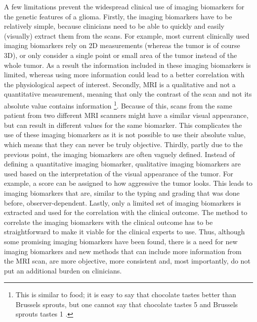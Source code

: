 A few limitations prevent the widespread clinical use of imaging biomarkers for the genetic features of a \gls{glioma}.
Firstly, the imaging biomarkers have to be relatively simple, because clinicians need to be able to quickly and easily (visually) extract them from the scans.
For example, most current clinically used imaging biomarkers rely on 2D measurements (whereas the \gls{tumor} is of course 3D), or only consider a single point or small area of the \gls{tumor} instead of the whole \gls{tumor}.
As a result the information included in these imaging biomarkers is limited, whereas using more information could lead to a better correlation with the physiological aspect of interest.
Secondly, \gls{MRI} is a qualitative and not a quantitative measurement, meaning that only the contrast of the scan and not its absolute value contains information \footnote{This is similar to food; it is easy to say that chocolate tastes better than Brussels sprouts, but one cannot say that chocolate tastes 5  and Brussels sprouts tastes 1 .}.
Because of this, scans from the same patient from two different \gls{MRI} scanners might have a similar visual appearance, but can result in different values for the same biomarker.
This complicates the use of these imaging biomarkers as it is not possible to use their absolute value, which means that they can never be truly objective.
Thirdly, partly due to the previous point, the imaging biomarkers are often vaguely defined.
Instead of defining a quantitative imaging biomarker, qualitative imaging biomarkers are used based on the interpretation of the visual appearance of the \gls{tumor}.
For example, a score can be assigned to how aggressive the \gls{tumor} looks.
This leads to imaging biomarkers that are, similar to the typing and grading that was done before, observer-dependent.
Lastly, only a limited set of imaging biomarkers is extracted and used for the correlation with the clinical outcome.
The method to correlate the imaging biomarkers with the clinical outcome has to be straightforward to make it viable for the clinical experts to use.
Thus, although some promising imaging biomarkers have been found, there is a need for new imaging biomarkers and new methods that can include more information from the \gls{MRI} scan, are more objective, more consistent and, most importantly, do not put an additional burden on clinicians.

